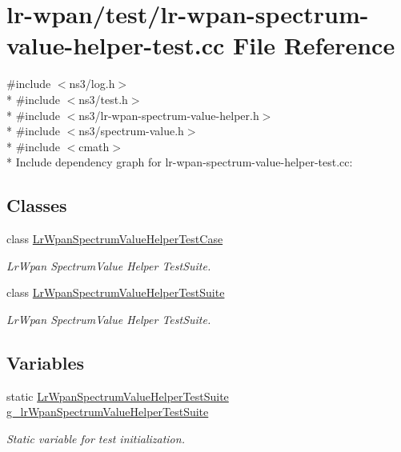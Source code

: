\hypertarget{lr-wpan-spectrum-value-helper-test_8cc}{}\section{lr-\/wpan/test/lr-\/wpan-\/spectrum-\/value-\/helper-\/test.cc File Reference}
\label{lr-wpan-spectrum-value-helper-test_8cc}
{\ttfamily \#include $<$ns3/log.\+h$>$}\\*
{\ttfamily \#include $<$ns3/test.\+h$>$}\\*
{\ttfamily \#include $<$ns3/lr-\/wpan-\/spectrum-\/value-\/helper.\+h$>$}\\*
{\ttfamily \#include $<$ns3/spectrum-\/value.\+h$>$}\\*
{\ttfamily \#include $<$cmath$>$}\\*
Include dependency graph for lr-\/wpan-\/spectrum-\/value-\/helper-\/test.cc\+:
\subsection*{Classes}
\begin{DoxyCompactItemize}
\item 
class \hyperlink{classLrWpanSpectrumValueHelperTestCase}{Lr\+Wpan\+Spectrum\+Value\+Helper\+Test\+Case}
\begin{DoxyCompactList}\small\item\em Lr\+Wpan Spectrum\+Value Helper Test\+Suite. \end{DoxyCompactList}\item 
class \hyperlink{classLrWpanSpectrumValueHelperTestSuite}{Lr\+Wpan\+Spectrum\+Value\+Helper\+Test\+Suite}
\begin{DoxyCompactList}\small\item\em Lr\+Wpan Spectrum\+Value Helper Test\+Suite. \end{DoxyCompactList}\end{DoxyCompactItemize}
\subsection*{Variables}
\begin{DoxyCompactItemize}
\item 
static \hyperlink{classLrWpanSpectrumValueHelperTestSuite}{Lr\+Wpan\+Spectrum\+Value\+Helper\+Test\+Suite} \hyperlink{lr-wpan-spectrum-value-helper-test_8cc_a8de18f734fe632686b02f8315f64d5dc}{g\+\_\+lr\+Wpan\+Spectrum\+Value\+Helper\+Test\+Suite}
\begin{DoxyCompactList}\small\item\em Static variable for test initialization. \end{DoxyCompactList}\end{DoxyCompactItemize}


